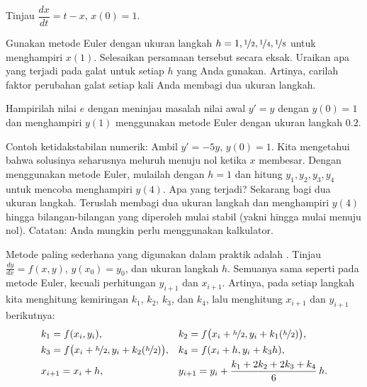 \begin{samepage}
\begin{exercise}
Tinjau $\dfrac{dx}{dt} = t-x$, $x(0)=1$.
\begin{tasks}
\task Gunakan metode Euler
dengan ukuran langkah $h = 1, \nicefrac{1}{2}, \nicefrac{1}{4}, \nicefrac{1}{8}$ untuk
menghampiri
$x(1)$.
\task Selesaikan persamaan tersebut secara eksak.
\task Uraikan apa yang terjadi pada
galat untuk setiap $h$ yang Anda gunakan.  Artinya, carilah faktor perubahan galat
setiap kali Anda membagi dua ukuran langkah.
\end{tasks}
\end{exercise}
\end{samepage}

\begin{exercise}
Hampirilah nilai $e$ dengan meninjau masalah nilai awal
$y'=y$ dengan $y(0)=1$ dan menghampiri $y(1)$ menggunakan metode Euler dengan
ukuran langkah $0.2$.
\end{exercise}

\begin{exercise}
Contoh ketidakstabilan numerik:
Ambil $y' = -5y$, $y(0) = 1$.  Kita mengetahui bahwa
solusinya seharusnya meluruh menuju nol ketika $x$ membesar.
Dengan menggunakan metode Euler, mulailah dengan $h=1$ dan hitung
$y_1, y_2, y_3, y_4$ untuk mencoba menghampiri $y(4)$.  Apa yang terjadi?
Sekarang bagi dua ukuran langkah.  Teruslah membagi dua ukuran langkah dan menghampiri $y(4)$
hingga bilangan-bilangan yang diperoleh
mulai stabil (yakni hingga mulai menuju nol).
Catatan: Anda mungkin perlu menggunakan kalkulator.
\end{exercise}

Metode paling sederhana yang digunakan dalam praktik adalah
\emph{}.
Tinjau $\frac{dy}{dx}=f(x,y)$, $y(x_0) = y_0$,
dan ukuran langkah $h$.  Semuanya sama seperti pada metode Euler, kecuali
perhitungan $y_{i+1}$ dan $x_{i+1}$.
Artinya, pada setiap langkah kita menghitung kemiringan $k_1$, $k_2$, $k_3$, dan $k_4$,
lalu menghitung $x_{i+1}$ dan $y_{i+1}$ berikutnya:
\begin{align*}
& k_1 = f(x_i,y_i) ,
&
& k_2 = f\bigl(x_i + \nicefrac{h}{2},y_i + k_1 (\nicefrac{h}{2})\bigr) ,
\\
& k_3 = f\bigl(x_i + \nicefrac{h}{2},y_i + k_2 (\nicefrac{h}{2})\bigr) ,
&
& k_4 = f(x_i + h,y_i + k_3 h) ,
\\
& x_{i+1} = x_i + h ,
&
& y_{i+1} = y_i + \frac{k_1 + 2k_2 + 2k_3 + k_4}{6}\,h .
\end{align*}


